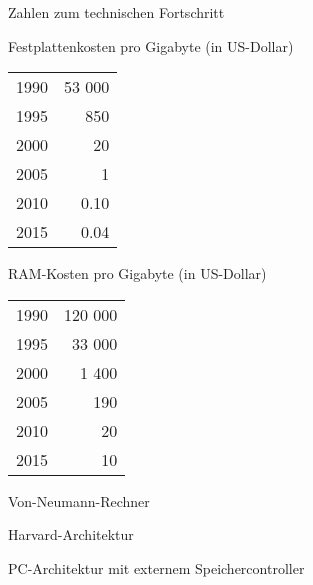 \documentclass[utf8,9pt]{beamer}
\begin{document}
\begin{frame}{Zahlen zum technischen Fortschritt}{}

\begin{block}{Festplattenkosten pro Gigabyte (in US-Dollar)}
\begin{tabular}{lr}

 1990  &   53 000\\
 1995  &   850\\
 2000  &   20\\
 2005  &   1\\
 2010  &   0.10\\
 2015  &   0.04\\
\end{tabular}
\end{block}

\begin{block}{RAM-Kosten pro Gigabyte (in US-Dollar)}
\begin{tabular}{lr}

 1990 &   120 000\\
 1995 &   33 000\\
 2000 &   1 400\\
 2005 &   190\\
 2010 &   20\\
 2015 &   10\\
\end{tabular}
\end{block}
\end{frame}




\begin{frame}{Von-Neumann-Rechner}{}
\end{frame}

\begin{frame}{Harvard-Architektur}{}
\end{frame}

\begin{frame}{PC-Architektur mit externem Speichercontroller}{}
\end{frame}
\end{document}
